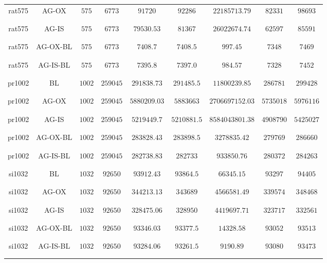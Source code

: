 \begin{table}[H]
{\begin{tabular}{c|cccccccc}
		rat575 &AG-OX & $575$ & $6773$ & $91720$ & $92286$ & $22185713.79$ & $82331$ & $98693$\\\\\\
		rat575 &AG-IS & $575$ & $6773$ & $79530.53$ & $81367$ & $26022674.74$ & $62597$ & $85591$\\\\\\
		rat575 &AG-OX-BL& $575$ & $6773$ & $7408.7$ & $7408.5$ & $997.45$ & $7348$ & $7469$\\\\\\
		rat575 &AG-IS-BL& $575$ & $6773$ & $7395.8$ & $7397.0$ & $984.57$ & $7328$ & $7452$\\\\\\
		\midrule 
		pr1002 &BL & $1002$ & $259045$ & $291838.73$ & $291485.5$ & $11800239.85$ & $286781$ & $299428$\\\\\\
		pr1002 &AG-OX & $1002$ & $259045$ & $5880209.03$ & $5883663$ & $2706697152.03$ & $5735018$ & $5976116$\\\\\\
		pr1002 &AG-IS & $1002$ & $259045$ & $5219449.7$ & $5210881.5$ & $8584043801.38$ & $4908790$ & $5425027$\\\\\\
		pr1002 &AG-OX-BL& $1002$ & $259045$ & $283828.43$ & $283898.5$ & $3278835.42$ & $279769$ & $286660$\\\\\\
		pr1002 &AG-IS-BL& $1002$ & $259045$ & $282738.83$ & $282733$ & $933850.76$ & $280372$ & $284263$\\\\\\
		\midrule 
		si1032 &BL & $1032$ & $92650$ & $93912.43$ & $93864.5$ & $66345.15$ & $93297$ & $94405$\\\\\\
		si1032 &AG-OX & $1032$ & $92650$ & $344213.13$ & $343689$ & $4566581.49$ & $339574$ & $348468$\\\\\\
		si1032 &AG-IS & $1032$ & $92650$ & $328475.06$ & $328950$ & $4419697.71$ & $323717$ & $332561$\\\\\\
		si1032 &AG-OX-BL& $1032$ & $92650$ & $93346.03$ & $93377.5$ & $14328.58$ & $93052$ & $93513$\\\\\\
		si1032 &AG-IS-BL& $1032$ & $92650$ & $93284.06$ & $93261.5$ & $9190.89$ & $93080$ & $93473$\\\\\\
		\midrule 



\end{tabular}}
\end{table}
